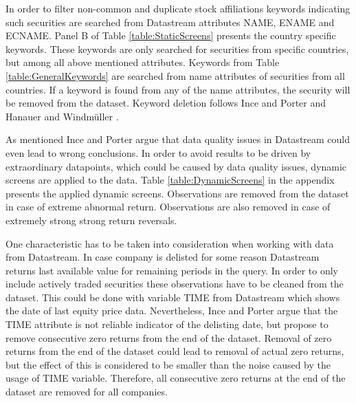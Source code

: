 \documentclass{article}
\begin{document}
In order to filter non-common and duplicate stock affiliations keywords indicating such securities are searched from Datastream attributes NAME, ENAME and ECNAME. Panel B of Table \ref{table:StaticScreens} presents the country specific keywords. These keywords are only  searched for securities from specific countries, but among all above mentioned attributes. Keywords from Table \ref{table:GeneralKeywords} are searched from name attributes of securities from all countries. If a keyword is found from any of the name attributes, the security will be removed from the dataset. Keyword deletion follows Ince and Porter \citeyear{Ince2006} and Hanauer and Windmüller \citeyear{HANAUER2023106712}. \par

As mentioned Ince and Porter \citeyear{Ince2006} argue that data quality issues in Datastream could even lead to wrong conclusions. In order to avoid results to be driven by extraordinary datapoints, which could be caused by data quality issues, dynamic screens are applied to the data. Table \ref{table:DynamicScreens} in the appendix presents the applied dynamic screens. Observations are removed from the dataset in case of extreme abnormal return. Observations are also removed in case of extremely strong strong return reversals.\par

One characteristic has to be taken into consideration when working with data from Datastream. In case company is delisted for some reason Datastream returns last available value for remaining periods in the query. In order to only include actively traded securities these observations have to be cleaned from the dataset. This could be done with variable TIME from Datastream which shows the date of last equity price data. Nevertheless, Ince and Porter \citeyear{Ince2006} argue that the TIME attribute is not reliable indicator of the delisting date, but propose to remove consecutive zero returns from the end of the dataset. Removal of zero returns from the end of the dataset could lead to removal of actual zero returns, but the effect of this is considered to be smaller than the noise caused by the usage of TIME variable. Therefore, all consecutive zero returns at the end of the dataset are removed for all companies. \par
\end{document}
